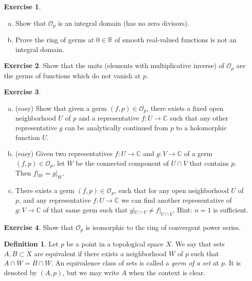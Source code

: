 \documentclass[12pt,openany]{book}
\newcommand{\C}{{\mathbb{C}}}
\newcommand{\R}{{\mathbb{R}}}
\newcommand{\sO}{{\mathscr{O}}}
\newcommand{\myindex}[1]{#1\index{#1}}
\theoremstyle{plain}
\theoremstyle{remark}
\theoremstyle{definition}
\newtheorem{defn}[thm]{Definition}
\newenvironment{exbox}{%
    \def\FrameCommand{\vrule width 1pt \relax\hspace{10pt}}%
    \MakeFramed {\advance \hsize -\width \FrameRestore}%
}{%
    \endMakeFramed
}
\newenvironment{exparts}{%
    \leavevmode\begin{enumerate}[a),noitemsep,topsep=0pt,parsep=0pt,partopsep=0pt]
}{%
    \end{enumerate}
}
\theoremstyle{exercise}
\newtheorem{exercise}{Exercise}[section]
\theoremstyle{example}
\begin{document}
\begin{exbox}
\begin{exercise}
\begin{exparts}
\item
Show that $\sO_p$ is an \myindex{integral domain} (has no zero divisors).
\item
Prove the ring of germs at $0 \in \R$ of smooth real-valued functions
is not an integral domain.
\end{exparts}
\end{exercise}

\begin{exercise}
Show that the units (elements with multiplicative inverse)
of $\sO_p$ are the germs of functions which do not vanish at
$p$.
\end{exercise}

\begin{exercise}
\begin{exparts}
\item (easy)
Show that given a germ $(f,p) \in \sO_p$,
there exists a fixed open neighborhood $U$
of $p$ and a representative $f \colon U \to \C$ such that any other
representative $g$ can be analytically continued from $p$ to a holomorphic
function $U$.
\item
(easy) Given two representatives $f \colon U \to \C$
and $g \colon V \to \C$ of a germ $(f,p) \in \sO_p$,
let $W$ be the connected component of $U \cap V$
that contains $p$.  Then $f|_W = g|_W$.
\item
There exists a germ $(f,p) \in \sO_p$, such that for
any open neighborhood $U$ of $p$, and
any representative $f \colon U \to \C$ we can
find another representative of $g \colon V \to \C$
of that same germ such that $g|_{U \cap V} \not= f|_{U \cap V}$.
Hint: $n=1$ is sufficient.
\end{exparts}
\end{exercise}

\begin{exercise}
Show that $\sO_p$ is isomorphic to the ring of convergent power series.
\end{exercise}
\end{exbox}


\begin{defn}
Let $p$ be a point in a topological space $X$.
We say that sets $A, B \subset X$ are equivalent
if there exists a neighborhood $W$ of $p$
such that $A \cap W = B \cap W$.
An equivalence class of sets 
is called a \emph{\myindex{germ of a set}} at $p$.
%
It is denoted by $(A,p)$, but we may write $A$ when
the context is clear.
\end{defn}
\end{document}
